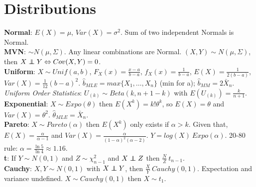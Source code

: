 \section*{Distributions}
\textbf{Normal}: $E(X)= \mu$, $Var(X) = \sigma^2$. Sum of two independent Normals is Normal. \\
\textbf{MVN}: $\sim N(\mu, \Sigma)$. Any linear combinations are Normal. $(X,Y) \sim N(\mu, \Sigma)$, then $X\independent Y \Leftrightarrow Cov(X,Y) = 0$. \\
\textbf{Uniform}: $X\sim Unif(a,b)$, $F_X(x) = \frac{x-a}{b-a}$, $f_X(x) = \frac{1}{b-a}$, $E(X) = \frac{1}{2(b-a)}$, $Var(X) = \frac{1}{12}(b-a)^2$. $\hat{b}_{MLE} = max\{X_1, \ldots, X_n\}$ (min for a); $\hat{b}_{MM} = 2\bar{X}_n$.\\
\textit{Uniform Order Statistics}: $U_{(k)} \sim Beta(k, n+1-k)$ with $E(U_{(k)}) = \frac{k}{n+1}$.
\textbf{Exponential}: $X\sim Expo(\theta)$ then $E(X^k) = k!\theta^k$, so $E(X) = \theta$ and $Var(X) = \theta^2$. $\hat{\theta}_{MLE} = \bar{X}_n$.\\
\textbf{Pareto}: $X\sim Pareto(\alpha)$ then $E(X^k)$ only exists if $\alpha>k$. Given that, $E(X) = \frac{\alpha}{\alpha-1}$ and $Var(X) = \frac{\alpha}{(1-\alpha)^2(\alpha-2)}$. $Y = log(X) ~ Expo(\alpha)$. 20-80 rule: $\alpha = \frac{\ln 5}{\ln 4}\approx 1.16$.\\
\textbf{t}: If $Y\sim N(0,1)$ and $Z\sim \chi^2_{n-1}$ and $X\independent Z$ then $\frac{N}{Z}~t_{n-1}$.\\
\textbf{Cauchy}: $X, Y \sim N(0, 1)$ with $X\independent Y$, then $\frac{X}{Y}~Cauchy(0,1)$. Expectation and variance undefined. $X\sim Cauchy(0,1)$ then $X\sim t_1$.